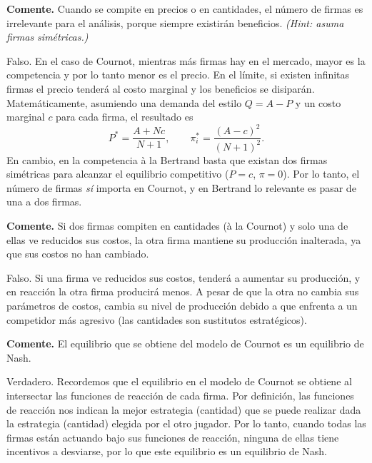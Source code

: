 \question \textbf{Comente.} Cuando se compite en precios o en cantidades, el número de firmas es irrelevante para el análisis, porque siempre existirán beneficios. \emph{(Hint: asuma firmas simétricas.)}
\begin{solution}
Falso. En el caso de Cournot, mientras más firmas hay en el mercado, mayor es la competencia y por lo tanto menor es el precio. En el límite, si existen infinitas firmas el precio tenderá al costo marginal y los beneficios se disiparán. Matemáticamente, asumiendo una demanda del estilo $Q = A - P$ y un costo marginal $c$ para cada firma, el resultado es
\[
  P^* = \frac{A + Nc}{N+1}, \qquad \pi_i^* = \frac{(A-c)^2}{(N+1)^2}.
\]
En cambio, en la competencia à la Bertrand basta que existan dos firmas simétricas para alcanzar el equilibrio competitivo ($P = c$, $\pi = 0$). Por lo tanto, el número de firmas \emph{sí} importa en Cournot, y en Bertrand lo relevante es pasar de una a dos firmas.

\end{solution}

\question \textbf{Comente.} Si dos firmas compiten en cantidades (à la Cournot) y solo una de ellas ve reducidos sus costos, la otra firma mantiene su producción inalterada, ya que sus costos no han cambiado.
\begin{solution}
Falso. Si una firma ve reducidos sus costos, tenderá a aumentar su producción, y en reacción la otra firma producirá menos. A pesar de que la otra no cambia sus parámetros de costos, cambia su nivel de producción debido a que enfrenta a un competidor más agresivo (las cantidades son sustitutos estratégicos).

\end{solution}

\question \textbf{Comente.} El equilibrio que se obtiene del modelo de Cournot es un equilibrio de Nash.
\begin{solution}
Verdadero. Recordemos que el equilibrio en el modelo de Cournot se obtiene al intersectar las funciones de reacción de cada firma. Por definición, las funciones de reacción nos indican la mejor estrategia (cantidad) que se puede realizar dada la estrategia (cantidad) elegida por el otro jugador. Por lo tanto, cuando todas las firmas están actuando bajo sus funciones de reacción, ninguna de ellas tiene incentivos a desviarse, por lo que este equilibrio es un equilibrio de Nash.

\end{solution}

